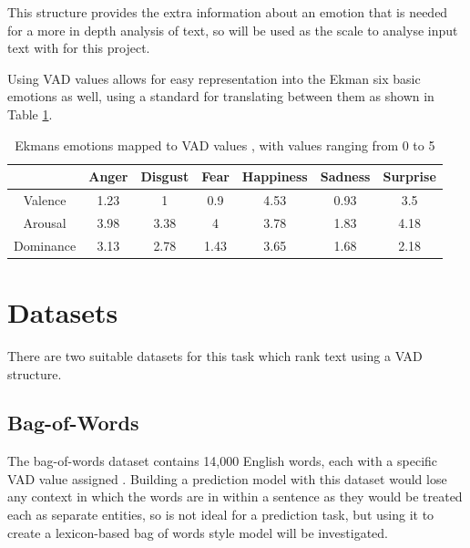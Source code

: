 This structure provides the extra information about an emotion that is needed for a more in depth analysis of text, so will be used as the scale to analyse input text with for this project.

Using VAD values allows for easy representation into the Ekman six basic emotions as well, using a standard for translating between them as shown in Table \ref{ekmansTable}.


\begin{table}[ht]
\caption{Ekmans emotions mapped to VAD values \cite{VADMapping}, with values ranging from 0 to 5}
\centering
\begin{tabular}{ |c|c|c|c|c|c|c| } 
 \hline
  & Anger & Disgust & Fear & Happiness & Sadness & Surprise \\ 
 \hline                        
 Valence & 1.23 & 1 & 0.9 & 4.53 & 0.93 & 3.5\\ 
 Arousal & 3.98 & 3.38 & 4 & 3.78 & 1.83 & 4.18\\ 
 Dominance & 3.13 & 2.78 & 1.43 & 3.65 & 1.68 & 2.18\\ 
 \hline
\end{tabular}
\label{ekmansTable}
\end{table}
\pagebreak
\section{Datasets}

There are two suitable datasets for this task which rank text using a VAD structure.

\subsection{Bag-of-Words}

The bag-of-words dataset contains 14,000 English words, each with a specific VAD value assigned \cite{wordsData}. Building a prediction model with this dataset would lose any context in which the words are in within a sentence as they would be treated each as separate entities, so is not ideal for a prediction task, but using it to create a lexicon-based bag of words style model will be investigated.


